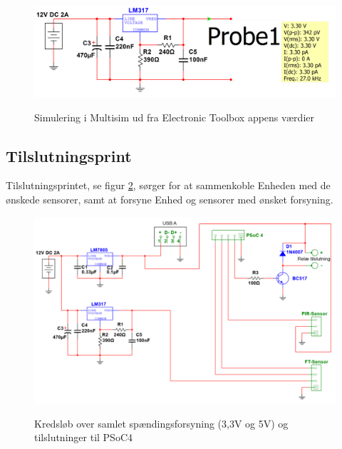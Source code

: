 \begin{figure}[H] \centering
{\includegraphics[width=\textwidth]{filer/design/Billeder/LM317_SIMULATION}}
\caption{Simulering i Multisim ud fra Electronic Toolbox appens værdier}
\label{lab:LM317_SIMULERING}
\raggedright
\end{figure}


\subsection{Tilslutningsprint}

Tilslutningsprintet, se figur \ref{lab:PSU_connections}, sørger for at sammenkoble Enheden med de ønskede sensorer, samt at forsyne Enhed og sensorer med ønsket forsyning.

\begin{figure}[H] \centering
{\includegraphics[width=\textwidth]{filer/design/Billeder/tilslutningsprint}}
\caption{Kredsløb over samlet spændingsforsyning (3,3V og 5V) og tilslutninger til PSoC4}
\label{lab:PSU_connections}
\raggedright
\end{figure}

